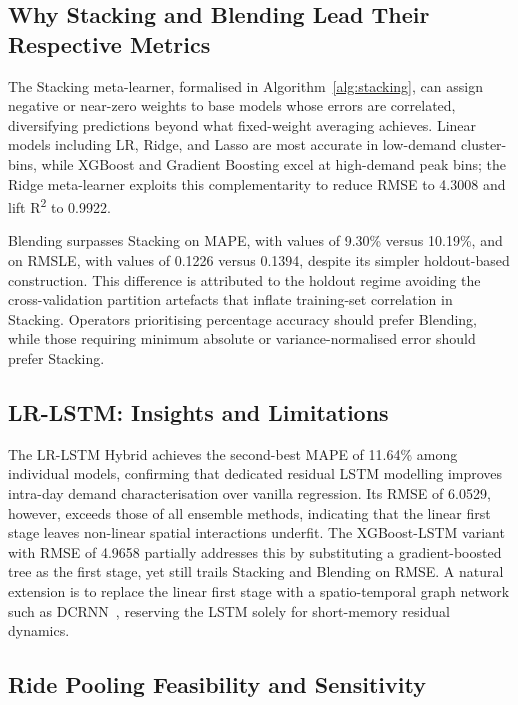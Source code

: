\documentclass[a4paper,fleqn]{cas-dc}
\begin{document}
\subsection{Why Stacking and Blending Lead Their Respective Metrics}

The Stacking meta-learner, formalised in Algorithm~\ref{alg:stacking}, can assign negative or near-zero weights to base models whose errors are correlated, diversifying predictions beyond what fixed-weight averaging achieves.  Linear models including LR, Ridge, and Lasso are most accurate in low-demand cluster-bins, while XGBoost and Gradient Boosting excel at high-demand peak bins; the Ridge meta-learner exploits this complementarity to reduce RMSE to 4.3008 and lift R\textsuperscript{2} to 0.9922.

Blending surpasses Stacking on MAPE, with values of 9.30\% versus 10.19\%, and on RMSLE, with values of 0.1226 versus 0.1394, despite its simpler holdout-based construction.  This difference is attributed to the holdout regime avoiding the cross-validation partition artefacts that inflate training-set correlation in Stacking.  Operators prioritising percentage accuracy should prefer Blending, while those requiring minimum absolute or variance-normalised error should prefer Stacking.

\subsection{LR-LSTM: Insights and Limitations}

The LR-LSTM Hybrid achieves the second-best MAPE of 11.64\% among individual models, confirming that dedicated residual LSTM modelling improves intra-day demand characterisation over vanilla regression.  Its RMSE of 6.0529, however, exceeds those of all ensemble methods, indicating that the linear first stage leaves non-linear spatial interactions underfit.  The XGBoost-LSTM variant with RMSE of 4.9658 partially addresses this by substituting a gradient-boosted tree as the first stage, yet still trails Stacking and Blending on RMSE.  A natural extension is to replace the linear first stage with a spatio-temporal graph network such as DCRNN~\cite{li2018diffusion}, reserving the LSTM solely for short-memory residual dynamics.

\subsection{Ride Pooling Feasibility and Sensitivity}
\end{document}

